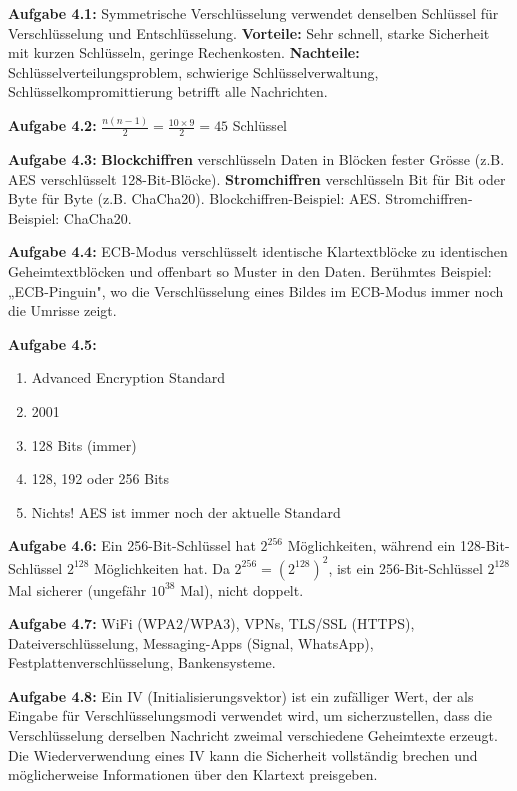 \documentclass[11pt,a4paper]{report}
\begin{document}
\textbf{Aufgabe 4.1:}
Symmetrische Verschlüsselung verwendet denselben Schlüssel für Verschlüsselung und Entschlüsselung. \textbf{Vorteile:} Sehr schnell, starke Sicherheit mit kurzen Schlüsseln, geringe Rechenkosten. \textbf{Nachteile:} Schlüsselverteilungsproblem, schwierige Schlüsselverwaltung, Schlüsselkompromittierung betrifft alle Nachrichten.

\textbf{Aufgabe 4.2:}
$\frac{n(n-1)}{2} = \frac{10 \times 9}{2} = 45$ Schlüssel

\textbf{Aufgabe 4.3:}
\textbf{Blockchiffren} verschlüsseln Daten in Blöcken fester Grösse (z.B. AES verschlüsselt 128-Bit-Blöcke). \textbf{Stromchiffren} verschlüsseln Bit für Bit oder Byte für Byte (z.B. ChaCha20). Blockchiffren-Beispiel: AES. Stromchiffren-Beispiel: ChaCha20.

\textbf{Aufgabe 4.4:}
ECB-Modus verschlüsselt identische Klartextblöcke zu identischen Geheimtextblöcken und offenbart so Muster in den Daten. Berühmtes Beispiel: „ECB-Pinguin", wo die Verschlüsselung eines Bildes im ECB-Modus immer noch die Umrisse zeigt.

\textbf{Aufgabe 4.5:}
\begin{enumerate}[label=\alph*)]
    \item Advanced Encryption Standard
    \item 2001
    \item 128 Bits (immer)
    \item 128, 192 oder 256 Bits
    \item Nichts! AES ist immer noch der aktuelle Standard
\end{enumerate}

\textbf{Aufgabe 4.6:}
Ein 256-Bit-Schlüssel hat $2^{256}$ Möglichkeiten, während ein 128-Bit-Schlüssel $2^{128}$ Möglichkeiten hat. Da $2^{256} = (2^{128})^2$, ist ein 256-Bit-Schlüssel $2^{128}$ Mal sicherer (ungefähr $10^{38}$ Mal), nicht doppelt.

\textbf{Aufgabe 4.7:}
WiFi (WPA2/WPA3), VPNs, TLS/SSL (HTTPS), Dateiverschlüsselung, Messaging-Apps (Signal, WhatsApp), Festplattenverschlüsselung, Bankensysteme.

\textbf{Aufgabe 4.8:}
Ein IV (Initialisierungsvektor) ist ein zufälliger Wert, der als Eingabe für Verschlüsselungsmodi verwendet wird, um sicherzustellen, dass die Verschlüsselung derselben Nachricht zweimal verschiedene Geheimtexte erzeugt. Die Wiederverwendung eines IV kann die Sicherheit vollständig brechen und möglicherweise Informationen über den Klartext preisgeben.
\end{document}
